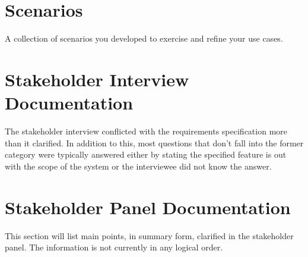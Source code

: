 \documentclass{l3deliverable}
\begin{document}
\section{Scenarios}

A collection of scenarios you developed to exercise and refine your
use cases.

\section{Stakeholder Interview Documentation}

The stakeholder interview conflicted with the requirements specification more
than it clarified. In addition to this, most questions that don't fall into the
former category were typically answered either by stating the specified
feature is out with the scope of the system or the interviewee did not
know the answer.

\section{Stakeholder Panel Documentation}

This section will list main points, in summary form, clarified in the
stakeholder panel. The information is not currently in any logical order.
\end{document}
